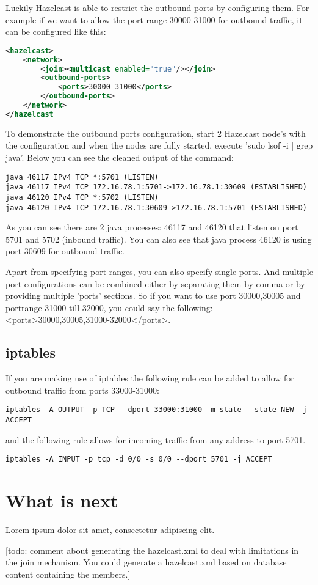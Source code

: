 Luckily Hazelcast is able to restrict the outbound ports by configuring them. For example if we want to allow the port range 30000-31000 for outbound traffic, it can be configured like this:
\begin{lstlisting}[language=xml]
<hazelcast>
    <network>
        <join><multicast enabled="true"/></join>
        <outbound-ports>
            <ports>30000-31000</ports>
        </outbound-ports>
    </network>
</hazelcast
\end{lstlisting}
To demonstrate the outbound ports configuration, start 2 Hazelcast node's with the configuration and when the nodes are fully started, execute 'sudo lsof -i | grep java'. Below you can see the cleaned output of the command:
\begin{lstlisting}
java 46117 IPv4 TCP *:5701 (LISTEN)
java 46117 IPv4 TCP 172.16.78.1:5701->172.16.78.1:30609 (ESTABLISHED)
java 46120 IPv4 TCP *:5702 (LISTEN)
java 46120 IPv4 TCP 172.16.78.1:30609->172.16.78.1:5701 (ESTABLISHED)
\end{lstlisting}
As you can see there are 2 java processes: 46117 and 46120 that listen on port 5701 and 5702 (inbound traffic). You can also see that java process 46120 is using port 30609 for outbound traffic.

Apart from specifying port ranges, you can also specify single ports. And multiple port configurations can be combined either by separating them by comma or by providing multiple 'ports' sections. So if you want to use port 30000,30005 and portrange 31000 till 32000, you could say the following: <ports>30000,30005,31000-32000</ports>. 

\subsection{iptables}
If you are making use of iptables the following rule can be added to allow for outbound traffic from ports 33000-31000:
\begin{lstlisting}
iptables -A OUTPUT -p TCP --dport 33000:31000 -m state --state NEW -j ACCEPT
\end{lstlisting}
and the following rule allows for incoming traffic from any address to port 5701.
\begin{lstlisting}
iptables -A INPUT -p tcp -d 0/0 -s 0/0 --dport 5701 -j ACCEPT
\end{lstlisting}

\section{What is next}
Lorem ipsum dolor sit amet, consectetur adipiscing elit. 

[todo: comment about generating the hazelcast.xml to deal with limitations in the join mechanism. You could generate
a hazelcast.xml based on database content containing the members.]

